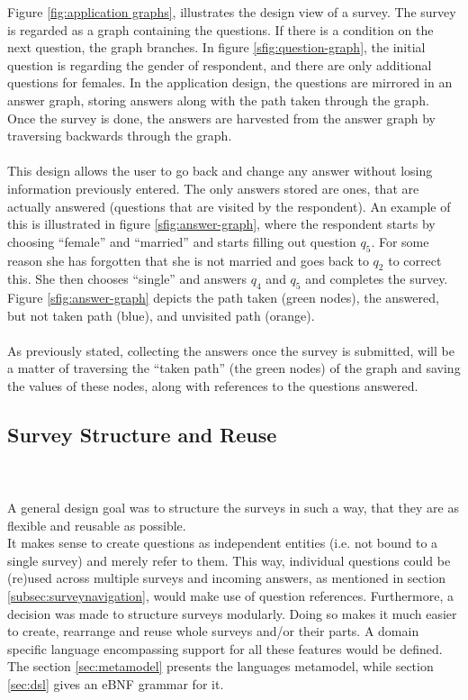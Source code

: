 Figure \ref{fig:application graphs}, illustrates the design view of a survey. The survey is regarded as a graph containing the questions. If there is a condition on the next question, the graph branches. In figure \ref{sfig:question-graph}, the initial question is regarding the gender of respondent, and there are only additional questions for females. In the application design, the questions are mirrored in an answer graph, storing answers along with the path taken through the graph. Once the survey is done, the answers are harvested from the answer graph by traversing backwards through the graph. \\\\
This design allows the user to go back and change any answer without losing information previously entered. The only answers stored are ones, that are actually answered (questions that are visited by the respondent). An example of this is illustrated in figure \ref{sfig:answer-graph}, where the respondent starts by choosing ``female'' and ``married'' and starts filling out question $q_5$. For some reason she has forgotten that she is not married and goes back to $q_2$ to correct this. She then chooses ``single'' and answers $q_4$ and $q_5$ and completes the survey. Figure \ref{sfig:answer-graph} depicts the path taken (green nodes), the answered, but not taken path (blue), and unvisited path (orange).\\\\
As previously stated, collecting the answers once the survey is submitted, will be a matter of traversing the ``taken path'' (the green nodes) of the graph and saving the values of these nodes, along with references to the questions answered.

\subsection{Survey Structure and Reuse}
\label{subsec:modularityandreuse}
\pawel \\\\
A general design goal was to structure the surveys in such a way, that they are as flexible and reusable as possible. \\
It makes sense to create questions as independent entities (i.e. not bound to a single survey) and merely refer to them. This way, individual questions could be (re)used across multiple surveys and incoming answers, as mentioned in section \ref{subsec:surveynavigation}, would make use of question references. Furthermore, a decision was made to structure surveys modularly. Doing so makes it much easier to create, rearrange and reuse whole surveys and/or their parts. 
A domain specific language encompassing support for all these features would be defined. The section \ref{sec:metamodel} presents the languages metamodel, while section \ref{sec:dsl} gives an eBNF grammar for it.

